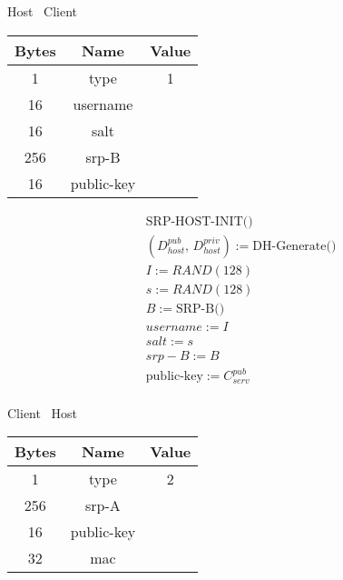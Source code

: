 \documentclass{article}
\begin{document}
    \begin{center}
        Host \textrightarrow\ Client\\
        \begin{tabular}{|c|c|c|}
            \hline
            \textbf{Bytes} & \textbf{Name} & \textbf{Value} \\
            \hline
            1              & type          & 1              \\
            \hline
            16             & username      &                \\
            \hline
            16             & salt          &                \\
            \hline
            256            & srp-B         &                \\
            \hline
            16             & public-key    &                \\
            \hline
        \end{tabular}
    \end{center}

    \begin{align*}
        & \text{SRP-HOST-INIT()}\\
        & (D_{host}^{pub},\, D_{host}^{priv}) := \text{DH-Generate()}\\
        & I := RAND(128)\\
        & s := RAND(128)\\
        & B := \text{SRP-B()}\\
        & username := I\\
        & salt := s\\
        & srp-B := B\\
        & \text{public-key} := C_{serv}^{pub}\\
    \end{align*}

    \begin{center}
        Client \textrightarrow\ Host\\
        \begin{tabular}{|c|c|c|}
            \hline
            \textbf{Bytes} & \textbf{Name} & \textbf{Value} \\
            \hline
            1              & type          & 2              \\
            \hline
            256            & srp-A         &                \\
            \hline
            16             & public-key    &                \\
            \hline
            32             & mac           &                \\
            \hline
        \end{tabular}
    \end{center}
\end{document}
